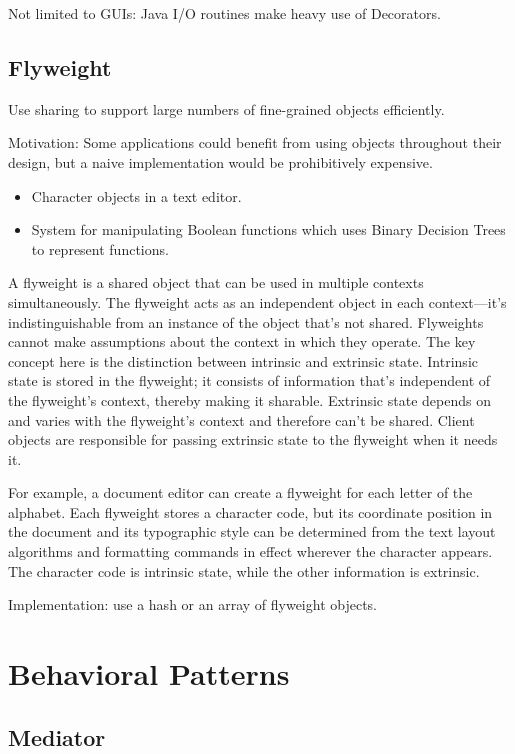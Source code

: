 \documentclass[11pt]{report}
\begin{document}
Not limited to GUIs: Java I/O routines make heavy use of Decorators.

\section{Flyweight}

Use sharing to support large numbers of fine-grained objects efficiently.

Motivation: Some applications could benefit from using objects throughout their design, but a naive implementation 
would be prohibitively expensive.

\begin{itemize}
\item Character objects in a text editor.
\item System for manipulating Boolean functions which uses Binary Decision Trees
to represent functions.
\end{itemize}

A flyweight is a shared object that can be used in multiple contexts simultaneously. The flyweight acts as an 
independent object in each context---it's indistinguishable from an instance of the object that's not shared. 
Flyweights cannot make assumptions about the context in which they operate. The key concept here is the distinction 
between intrinsic and extrinsic state. Intrinsic state is stored in the flyweight; it consists of information that's 
independent of the flyweight's context, thereby making it sharable. Extrinsic state depends on and varies with the 
flyweight's context and therefore can't be shared. Client objects are responsible for passing extrinsic state to the 
flyweight when it needs it.

For example, a document editor can create a flyweight for each letter of the alphabet. Each flyweight stores a character code, but its coordinate position in the document and its typographic style can be determined from the text layout algorithms and formatting commands in effect wherever the character appears. The character code is intrinsic state, while the other information is extrinsic.

Implementation: use a hash or an array of flyweight objects.

\chapter{Behavioral Patterns}

\section{Mediator}
\end{document}
